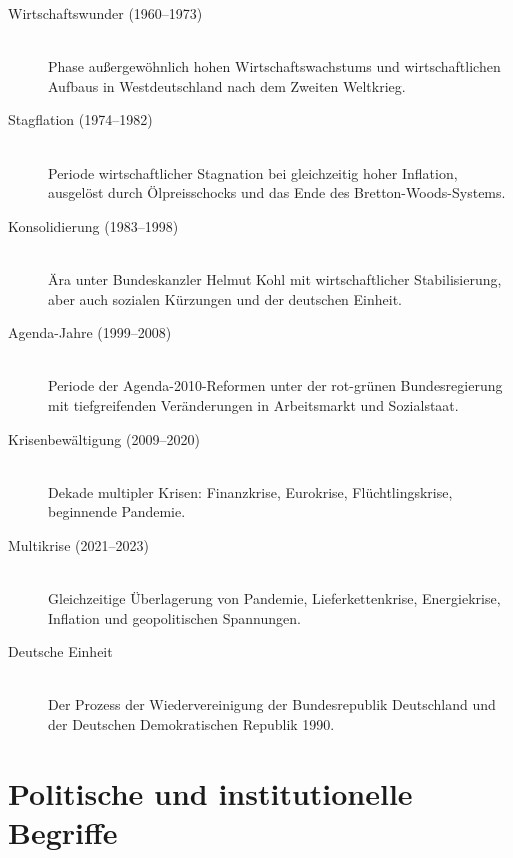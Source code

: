 \begin{description}
    \item[Wirtschaftswunder (1960–1973)] \hfill \\
    Phase außergewöhnlich hohen Wirtschaftswachstums und wirtschaftlichen Aufbaus in Westdeutschland nach dem Zweiten Weltkrieg.
    
    \item[Stagflation (1974–1982)] \hfill \\
    Periode wirtschaftlicher Stagnation bei gleichzeitig hoher Inflation, ausgelöst durch Ölpreisschocks und das Ende des Bretton-Woods-Systems.
    
    \item[Konsolidierung (1983–1998)] \hfill \\
    Ära unter Bundeskanzler Helmut Kohl mit wirtschaftlicher Stabilisierung, aber auch sozialen Kürzungen und der deutschen Einheit.
    
    \item[Agenda-Jahre (1999–2008)] \hfill \\
    Periode der Agenda-2010-Reformen unter der rot-grünen Bundesregierung mit tiefgreifenden Veränderungen in Arbeitsmarkt und Sozialstaat.
    
    \item[Krisenbewältigung (2009–2020)] \hfill \\
    Dekade multipler Krisen: Finanzkrise, Eurokrise, Flüchtlingskrise, beginnende Pandemie.
    
    \item[Multikrise (2021–2023)] \hfill \\
    Gleichzeitige Überlagerung von Pandemie, Lieferkettenkrise, Energiekrise, Inflation und geopolitischen Spannungen.
    
    \item[Deutsche Einheit] \hfill \\
    Der Prozess der Wiedervereinigung der Bundesrepublik Deutschland und der Deutschen Demokratischen Republik 1990.
\end{description}

\section{Politische und institutionelle Begriffe}

